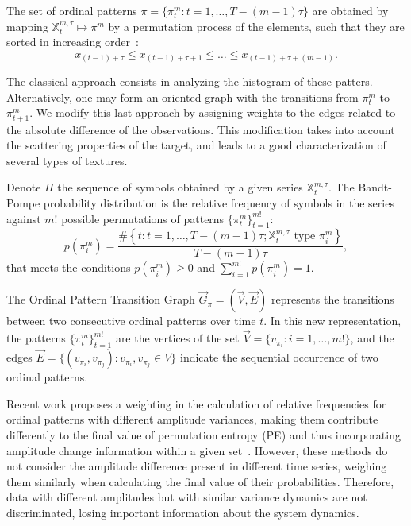 \documentclass{isprs}
\begin{document}
The set of ordinal patterns $\pi = \{\pi_t^m: t = 1, \dots, T- (m-1) \tau \}$ are obtained by mapping $\mathbb{X}^{m, \tau}_t \mapsto \pi^m$ by a permutation process of the elements, such that they are sorted in increasing order~\citep{Ravetti2014noise}:
$$
x_{(t-1) + \tau} \leq x_{(t-1) + \tau + 1} \leq \dots \leq x_{(t-1) + \tau + (m-1)}.
$$

The classical approach consists in analyzing the histogram of these patters.
Alternatively, one may form an oriented graph with the transitions from $\pi_t^m$ to $\pi_{t+1}^m$.
We modify this last approach by assigning weights to the edges related to the absolute difference of the observations.
This modification takes into account the scattering properties of the target, and leads to a good characterization of several types of textures.

Denote $\Pi$ the sequence of symbols obtained by a given series $\mathbb{X}_t^{m,\tau}$.
The Bandt-Pompe probability distribution is the relative frequency of symbols in the series against $m!$ possible permutations of patterns $\{\pi_t^m \}_{t = 1}^{m!}$:
\begin{equation}
p(\pi_i^m) = \frac{\#\left \{t : t = 1, \dots, T-(m-1)\tau; \mathbb{X}_t^{m,\tau} \text{ type } \pi_i^m\right \}}{T- (m-1)\tau},  
\end{equation}
that meets the conditions $p(\pi_i^m) \ge 0$ and  $\sum_{i=1}^{m!} p(\pi_i^m) = 1$.

The Ordinal Pattern Transition Graph $\vec{G}_{\pi} = (\vec{V}, \vec{E})$ represents the transitions between two consecutive ordinal patterns over time $t$.
In this new representation, the patterns $\{\pi_t^m \}_{t = 1}^{m!}$ are the vertices of the set $\vec{V} = \{v_{\pi_i}: i = 1, \dots, m! \}$, and the edges $\vec{E} = \{(v_{\pi_i}, v_{\pi_j}): v_{\pi_i}, v_{\pi_j} \in V \}$ indicate the sequential occurrence of two ordinal patterns.

Recent work proposes a weighting in the calculation of relative frequencies for ordinal patterns with different amplitude variances, making them contribute differently to the final value of permutation entropy (PE) and thus incorporating amplitude change information within a given set~\citep{Fadlallah2013Weightedpermutation}.
However, these methods do not consider the amplitude difference present in different time series, weighing them similarly when calculating the final value of their probabilities.
Therefore, data with different amplitudes but with similar variance dynamics are not discriminated, losing important information about the system dynamics.
\end{document}
